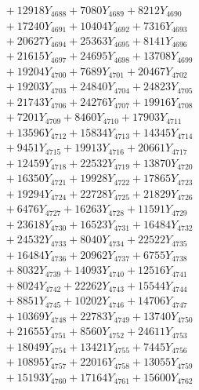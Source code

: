 \documentclass[a4paper,10pt]{article}
\begin{document}
{\begin{align}
&\;  + 12918 Y_{4688} + 7080 Y_{4689} + 8212 Y_{4690} \\[0.3ex]
&\;  + 17240 Y_{4691} + 10404 Y_{4692} + 7316 Y_{4693} \\[0.3ex]
&\;  + 20627 Y_{4694} + 25363 Y_{4695} + 8141 Y_{4696} \\[0.3ex]
&\;  + 21615 Y_{4697} + 24695 Y_{4698} + 13708 Y_{4699} \\[0.3ex]
&\;  + 19204 Y_{4700} + 7689 Y_{4701} + 20467 Y_{4702} \\[0.3ex]
&\;  + 19203 Y_{4703} + 24840 Y_{4704} + 24823 Y_{4705} \\[0.3ex]
&\;  + 21743 Y_{4706} + 24276 Y_{4707} + 19916 Y_{4708} \\[0.5ex]\allowbreak
&\;  + 7201 Y_{4709} + 8460 Y_{4710} + 17903 Y_{4711} \\[0.3ex]
&\;  + 13596 Y_{4712} + 15834 Y_{4713} + 14345 Y_{4714} \\[0.3ex]
&\;  + 9451 Y_{4715} + 19913 Y_{4716} + 20661 Y_{4717} \\[0.3ex]
&\;  + 12459 Y_{4718} + 22532 Y_{4719} + 13870 Y_{4720} \\[0.3ex]
&\;  + 16350 Y_{4721} + 19928 Y_{4722} + 17865 Y_{4723} \\[0.3ex]
&\;  + 19294 Y_{4724} + 22728 Y_{4725} + 21829 Y_{4726} \\[0.3ex]
&\;  + 6476 Y_{4727} + 16263 Y_{4728} + 11591 Y_{4729} \\[0.3ex]
&\;  + 23618 Y_{4730} + 16523 Y_{4731} + 16484 Y_{4732} \\[0.3ex]
&\;  + 24532 Y_{4733} + 8040 Y_{4734} + 22522 Y_{4735} \\[0.3ex]
&\;  + 16484 Y_{4736} + 20962 Y_{4737} + 6755 Y_{4738} \\[0.5ex]\allowbreak
&\;  + 8032 Y_{4739} + 14093 Y_{4740} + 12516 Y_{4741} \\[0.3ex]
&\;  + 8024 Y_{4742} + 22262 Y_{4743} + 15544 Y_{4744} \\[0.3ex]
&\;  + 8851 Y_{4745} + 10202 Y_{4746} + 14706 Y_{4747} \\[0.3ex]
&\;  + 10369 Y_{4748} + 22783 Y_{4749} + 13740 Y_{4750} \\[0.3ex]
&\;  + 21655 Y_{4751} + 8560 Y_{4752} + 24611 Y_{4753} \\[0.3ex]
&\;  + 18049 Y_{4754} + 13421 Y_{4755} + 7445 Y_{4756} \\[0.3ex]
&\;  + 10895 Y_{4757} + 22016 Y_{4758} + 13055 Y_{4759} \\[0.3ex]
&\;  + 15193 Y_{4760} + 17164 Y_{4761} + 15600 Y_{4762} \\[0.3ex]

\end{align}}
\end{document}
